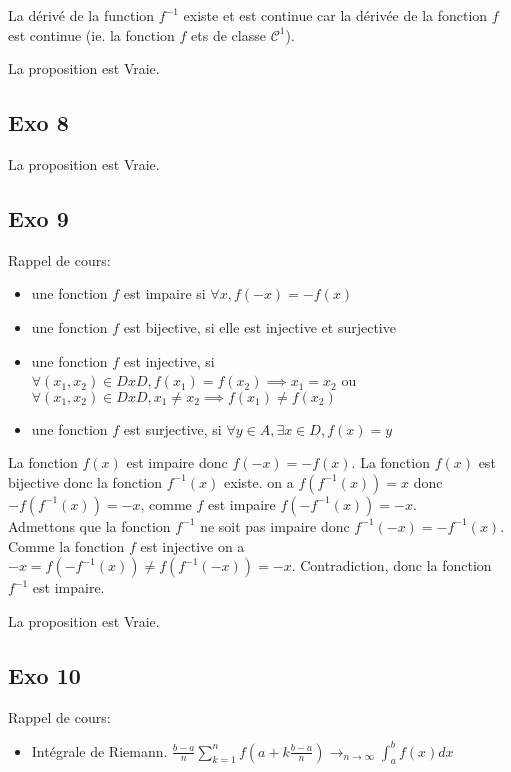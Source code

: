 \documentclass[]{book}
\theoremstyle{definition}
\begin{document}
La d\'eriv\'e de la function $f^{-1}$ existe et est continue car la d\'eriv\'ee de la fonction $f$ est continue (ie. la fonction $f$ ets de classe $\mathcal{C}^1$).

La proposition est Vraie.

\subsection*{Exo 8}


La proposition est Vraie.

\subsection*{Exo 9}
Rappel de cours:\\
\begin{itemize}
\item une fonction $f$ est impaire si $\forall x, f(-x) = -f(x)$
\item une fonction $f$ est bijective, si elle est injective et surjective
\item une fonction $f$ est injective, si $\forall (x_1, x_2) \in D x D, f(x_1) = f(x_2) \implies x_1 = x_2$ ou $\forall (x_1, x_2) \in D x D, x_1 \neq x_2 \implies f(x_1) \neq f(x_2)$
\item une fonction $f$ est surjective, si $\forall y \in A, \exists x \in D, f(x) = y$ 
\end{itemize}

La fonction $f(x)$ est impaire donc $f(-x) = -f(x)$. La fonction $f(x)$ est bijective donc la fonction $f^{-1}(x)$ existe.  on a $f(f^{-1}(x)) = x$ donc $-f(f^{-1}(x)) = -x$, comme $f$ est impaire $f(-f^{-1}(x)) = -x$.\\

Admettons que la fonction $f^{-1}$ ne soit pas impaire donc $f^{-1}(-x) = -f^{-1}(x)$. Comme la fonction $f$ est injective on a $-x = f(-f^{-1}(x)) \neq f(f^{-1}(-x)) = -x$. Contradiction, donc la fonction $f^{-1}$ est impaire.

La proposition est Vraie.

\subsection*{Exo 10}
Rappel de cours:
\begin{itemize}
\item Int\'egrale de Riemann. $\frac{b-a}{n}\sum_{k=1}^{n}f(a+k\frac{b-a}{n}) \to_{n \to \infty} \int_{a}^{b} f(x)dx$
\end{itemize}
\end{document}
